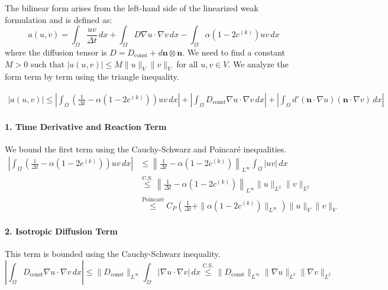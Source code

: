 \documentclass[12pt, a4paper, twoside, openright]{report}
\begin{document}
The bilinear form arises from the left-hand side of the linearized weak formulation and is defined as:
\[
  a(u, v) = \int_{\Omega} \frac{u v}{\Delta t} \, dx + \int_{\Omega} D \nabla u \cdot \nabla v \, dx - \int_{\Omega} \alpha(1-2c^{(k)}) u v \, dx
  \]
  where the diffusion tensor is $D = D_{\text{const}} + d \mathbf{n} \otimes \mathbf{n}$. We need to find a constant $M > 0$ such that $|a(u, v)| \leq M \|u\|_{V} \|v\|_{V}$ for all $u, v \in V$. We analyze the form term by term using the triangle inequality.

  \begin{align*}
  |a(u, v)| \leq \left| \int_{\Omega} \left( \frac{1}{\Delta t} - \alpha(1-2c^{(k)}) \right) u v \, dx \right| + \left| \int_{\Omega} D_{\text{const}} \nabla u \cdot \nabla v \, dx \right| + \left| \int_{\Omega} d' (\mathbf{n} \cdot \nabla u)(\mathbf{n} \cdot \nabla v) \, dx \right|
  \end{align*}

  \paragraph{1. Time Derivative and Reaction Term}
  We bound the first term using the Cauchy-Schwarz and Poincaré inequalities.
  \begin{align*}
  \left| \int_{\Omega} \left( \frac{1}{\Delta t} - \alpha(1-2c^{(k)}) \right) u v \, dx \right|
  &\leq \left\| \frac{1}{\Delta t} - \alpha(1-2c^{(k)}) \right\|_{L^\infty} \int_{\Omega} |uv| \, dx \\
    &\overset{\text{C.S.}}{\leq} \left\| \frac{1}{\Delta t} - \alpha(1-2c^{(k)}) \right\|_{L^\infty} \|u\|_{L^2} \|v\|_{L^2} \\
    &\overset{\text{Poincaré}}{\leq} C_P \left( \frac{1}{\Delta t} + \|\alpha(1-2c^{(k)})\|_{L^\infty} \right) \|u\|_{V} \|v\|_{V}
    \end{align*}

    \paragraph{2. Isotropic Diffusion Term}
    This term is bounded using the Cauchy-Schwarz inequality.
    \[
      \left| \int_{\Omega} D_{\text{const}} \nabla u \cdot \nabla v \, dx \right| \leq \|D_{\text{const}}\|_{L^\infty} \int_{\Omega} |\nabla u \cdot \nabla v| \, dx \overset{\text{C.S.}}{\leq} \|D_{\text{const}}\|_{L^\infty} \|\nabla u\|_{L^2} \|\nabla v\|_{L^2}
      \]
\end{document}
